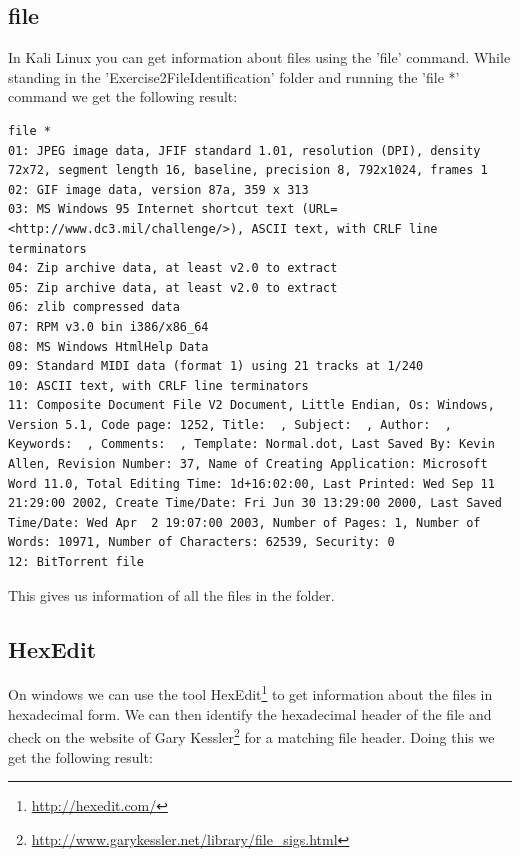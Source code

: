 \documentclass[a4paper,10pt,oneside]{article}
\begin{document}
\subsection{file}
In Kali Linux you can get information about files using the 'file' command. While standing in the 'Exercise2\textunderscore File\textunderscore Identification' folder and
running the 'file *' command we get the following result:

\begin{lstlisting}[caption=Result from 'file' command]
file *
01: JPEG image data, JFIF standard 1.01, resolution (DPI), density 72x72, segment length 16, baseline, precision 8, 792x1024, frames 1
02: GIF image data, version 87a, 359 x 313
03: MS Windows 95 Internet shortcut text (URL=<http://www.dc3.mil/challenge/>), ASCII text, with CRLF line terminators
04: Zip archive data, at least v2.0 to extract
05: Zip archive data, at least v2.0 to extract
06: zlib compressed data
07: RPM v3.0 bin i386/x86_64
08: MS Windows HtmlHelp Data
09: Standard MIDI data (format 1) using 21 tracks at 1/240
10: ASCII text, with CRLF line terminators
11: Composite Document File V2 Document, Little Endian, Os: Windows, Version 5.1, Code page: 1252, Title:  , Subject:  , Author:  , Keywords:  , Comments:  , Template: Normal.dot, Last Saved By: Kevin Allen, Revision Number: 37, Name of Creating Application: Microsoft Word 11.0, Total Editing Time: 1d+16:02:00, Last Printed: Wed Sep 11 21:29:00 2002, Create Time/Date: Fri Jun 30 13:29:00 2000, Last Saved Time/Date: Wed Apr  2 19:07:00 2003, Number of Pages: 1, Number of Words: 10971, Number of Characters: 62539, Security: 0
12: BitTorrent file
\end{lstlisting}


This gives us information of all the files in the folder.

\subsection{HexEdit}
On windows we can use the tool HexEdit\footnote{\url{http://hexedit.com/}} to get information about the files in hexadecimal form.
We can then identify the hexadecimal header of the file and check on the website of Gary Kessler\footnote{\url{http://www.garykessler.net/library/file_sigs.html}} for a matching file header.
Doing this we get the following result:
\end{document}
